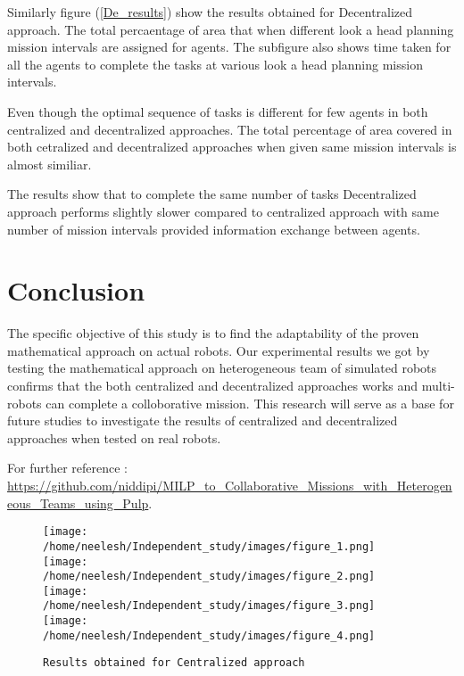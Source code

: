 \documentclass[conference]{IEEEtran}
\begin{document}
{Similarly figure (\ref{De_results}) show the results obtained for Decentralized approach. The total percaentage of area that when different look a head planning mission intervals are assigned for agents. The subfigure also shows time taken for all the agents to complete the tasks at various look a head planning mission intervals. 

Even though the optimal sequence of tasks is different for few agents in both  centralized and decentralized approaches. The total percentage of area covered in both cetralized and decentralized approaches when given same mission intervals is almost similiar. 

The results show that to complete the same number of tasks Decentralized approach performs slightly slower compared to centralized approach with same number of mission intervals provided information exchange between agents.


\section{Conclusion}
The specific objective of this study is to find the adaptability of the proven mathematical approach on actual robots. Our experimental results we got by testing the mathematical approach on heterogeneous team of simulated robots confirms that the both centralized and decentralized approaches works and multi-robots can complete a colloborative mission. 
This research will serve as a base for future studies to investigate the results of centralized and decentralized approaches when tested on real robots.
 
For further reference : \url{https://github.com/niddipi/MILP_to_Collaborative_Missions_with_Heterogeneous_Teams_using_Pulp}.

\begin{figure}
\hfill\begin{minipage}{0.5\textwidth}\centering
\texttt{[image: /home/neelesh/Independent\_study/images/figure\_1.png]}
\texttt{[image: /home/neelesh/Independent\_study/images/figure\_2.png]}
\texttt{[image: /home/neelesh/Independent\_study/images/figure\_3.png]}
\texttt{[image: /home/neelesh/Independent\_study/images/figure\_4.png]}
\caption{\texttt{Results obtained for Centralized approach}}\label{Cen_agents}
\end{minipage}
\end{figure}

}
\end{document}
